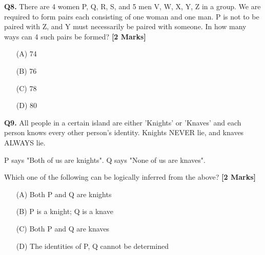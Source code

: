 \documentclass[11pt]{article}
\newcommand{\questionb}[2]{
    \noindent\textbf{Q#2.} #1 \hfill \textbf{[2 Marks]}
}
\begin{document}
\vspace{0.5cm}

\questionb{There are 4 women P, Q, R, S, and 5 men V, W, X, Y, Z in a group. We are required to form pairs each consisting of one woman and one man. P is not to be paired with Z, and Y must necessarily be paired with someone. In how many ways can 4 such pairs be formed?}{8}
\begin{enumerate}
    \item[(A)] 74
    \item[(B)] 76  
    \item[(C)] 78
    \item[(D)] 80
\end{enumerate}

\vspace{0.5cm}

\questionb{All people in a certain island are either 'Knights' or 'Knaves' and each person knows every other person's identity. Knights NEVER lie, and knaves ALWAYS lie.

P says "Both of us are knights". Q says "None of us are knaves".

Which one of the following can be logically inferred from the above?}{9}
\begin{enumerate}
    \item[(A)] Both P and Q are knights
    \item[(B)] P is a knight; Q is a knave  
    \item[(C)] Both P and Q are knaves
    \item[(D)] The identities of P, Q cannot be determined
\end{enumerate}

\vspace{0.5cm}
\end{document}
